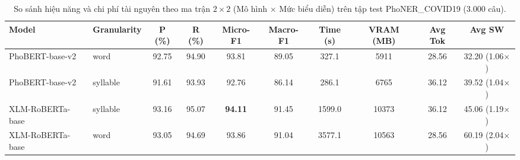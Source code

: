 \begin{table}[t]
\centering
\small
\begin{tabular}{llcccccccc}
\hline
\textbf{Model} & \textbf{Granularity} & \textbf{P (\%)} & \textbf{R (\%)} & \textbf{Micro-F1} & \textbf{Macro-F1} & \textbf{Time (s)} & \textbf{VRAM (MB)} & \textbf{Avg Tok} & \textbf{Avg SW} \\
\hline
PhoBERT-base-v2 & word & 92.75 & 94.90 & 93.81 & 89.05 & 327.1 & 5911 & 28.56 & 32.20 (1.06$\times$) \\
PhoBERT-base-v2 & syllable & 91.61 & 93.93 & 92.76 & 86.14 & 286.1 & 6765 & 36.12 & 39.52 (1.04$\times$) \\
XLM-RoBERTa-base & syllable & 93.16 & 95.07 & \textbf{94.11} & 91.45 & 1599.0 & 10373 & 36.12 & 45.06 (1.19$\times$) \\
XLM-RoBERTa-base & word & 93.05 & 94.69 & 93.86 & 91.04 & 3577.1 & 10563 & 28.56 & 60.19 (2.04$\times$) \\
\hline
\end{tabular}
\caption{So sánh hiệu năng và chi phí tài nguyên theo ma trận $2\times 2$ (Mô hình $\times$ Mức biểu diễn) trên tập test PhoNER\_COVID19 (3.000 câu).}
\label{tab:granularity-phoner}
\end{table}
